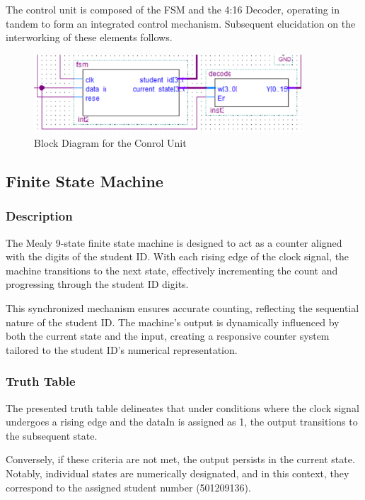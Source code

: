 
	{The control unit is composed of the FSM and the 4:16 Decoder, operating in tandem to form an integrated control mechanism. Subsequent elucidation on the interworking of these elements follows.}

	\begin{figure}[H]
		\centering
		\includegraphics[width=10cm]{Pictures/ControlUnit.png}
		\caption{{Block Diagram for the Conrol Unit}}
		\label{FSM}
	\end{figure}

\subsection{{Finite State Machine}}

	\subsubsection{{Description}}
	
		{The Mealy 9-state finite state machine is designed to act as a counter aligned with the digits of the student ID. With each rising edge of the clock signal, the machine transitions to the next state, effectively incrementing the count and progressing through the student ID digits.}
			
		{This synchronized mechanism ensures accurate counting, reflecting the sequential nature of the student ID. The machine's output is dynamically influenced by both the current state and the input, creating a responsive counter system tailored to the student ID's numerical representation.}
	
	\subsubsection{{Truth Table}}
	
		{The presented truth table delineates that under conditions where the clock signal undergoes a rising edge and the dataIn is assigned as 1, the output transitions to the subsequent state.}
		
		{Conversely, if these criteria are not met, the output persists in the current state. Notably, individual states are numerically designated, and in this context, they correspond to the assigned student number (501209136).}

